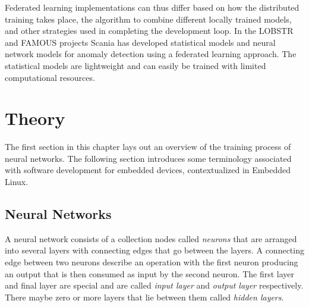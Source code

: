 Federated learning implementations can thus differ based on how the distributed training takes place, the algorithm to combine different locally trained models, and other strategies used in completing the development loop. In the LOBSTR \cite{lobstr} and FAMOUS \cite{famous} projects Scania has developed statistical models and neural network models for anomaly detection using a federated learning approach. The statistical models are lightweight and can easily be trained with limited computational resources.





\chapter{Theory}

The first section in this chapter lays out an overview of the training process of neural networks. The following section introduces some terminology associated with software development for embedded devices, contextualized in Embedded Linux.

\section{Neural Networks}

A neural network consists of a collection nodes called \textit{neurons} that are arranged into several layers with connecting edges that go between the layers. A connecting edge between two neurons describe an operation with the first neuron producing an output that is then consumed as input by the second neuron. The first layer and final layer are special and are called \textit{input layer} and \textit{output layer} respectively. There maybe zero or more layers that lie between them called \textit{hidden layers}.

